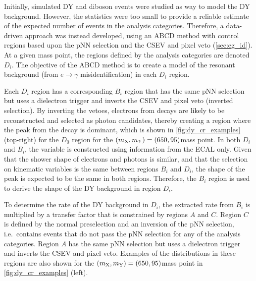 Initially, simulated DY and diboson events were studied as way to model the DY background. However, the statistics were too small to provide a reliable estimate of the expected number of events in the analysis categories. Therefore, a data-driven approach was instead developed, using an ABCD method with control regions based upon the pNN selection and the CSEV and pixel veto (\cref{sec:eg_id}). At a given mass point, the regions defined by the analysis categories are denoted $D_i$. The objective of the ABCD method is to create a model of the resonant background (from $e\to\gamma$ misidentification) in each $D_i$ region. 

Each $D_i$ region has a corresponding $B_i$ region that has the same pNN selection but uses a dielectron trigger and inverts the CSEV and pixel veto (inverted selection). By inverting the vetoes, electrons from \Zee decays are likely to be reconstructed and selected as photon candidates, thereby creating a region where the \mgg peak from the \Zee decay is dominant, which is shown in \cref{fig:dy_cr_examples} (top-right) for the $D_0$ region for the $(m_{\mathrm{X}},m_{\mathrm{Y}})=(650,95)$\GeV mass point. In both $D_i$ and $B_i$, the \mgg variable is constructed using information from the ECAL only. Given that the shower shape of electrons and photons is similar, and that the selection on kinematic variables is the same between regions $B_i$ and $D_i$, the shape of the \mgg peak is expected to be the same in both regions. Therefore, the $B_i$ region is used to derive the shape of the DY background in region $D_i$.

To determine the rate of the DY background in $D_i$, the extracted rate from $B_i$ is multiplied by a transfer factor that is constrained by regions $A$ and $C$. Region $C$ is defined by the normal preselection and an inversion of the pNN selection, i.e.\ contains events that do not pass the pNN selection for any of the analysis categories. Region $A$ has the same pNN selection but uses a dielectron trigger and inverts the CSEV and pixel veto. Examples of the \mgg distributions in these regions are also shown for the $(m_{\mathrm{X}},m_{\mathrm{Y}})=(650,95)$\GeV mass point in \cref{fig:dy_cr_examples} (left). 

